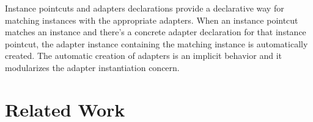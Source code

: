 \documentclass{llncs}
\begin{document}
Instance pointcuts and adapters declarations provide a declarative way for matching instances with the appropriate adapters. When an instance pointcut matches an instance and there's a concrete adapter declaration for that instance pointcut, the adapter instance containing the matching instance is automatically created. The automatic creation of adapters is an implicit behavior and it modularizes the adapter instantiation concern. 


\section{Related Work}
\end{document}

